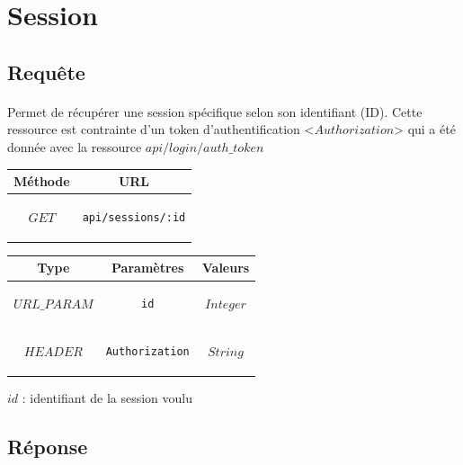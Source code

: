 \documentclass[titlepage, 12pt]{report}
\begin{document}
%
%

\section{Session}

\subsection{Requête}

\paragraph{} Permet de récupérer une session spécifique selon son identifiant (ID). Cette ressource est contrainte d'un token d'authentification <$Authorization$> qui a été donnée avec la ressource $api/login/auth\_token$

\begin{center}
	\begin{tabular}{|c|c|}
	\hline
	Méthode & URL \\
	\hline
	$ GET $ 
	&
	\begin{lstlisting}
api/sessions/:id
	\end{lstlisting} 
	\\ \hline
	\end{tabular}
\end{center}


\begin{center}
	\begin{tabular}{|c|c|c|}
	\hline
	Type & Paramètres & Valeurs \\ \hline
	$ URL\_PARAM $ & 
	\begin{lstlisting}
id
	\end{lstlisting} &
	$ Integer $ \\ \hline
	$ HEADER $ & 
	\begin{lstlisting}
Authorization
	\end{lstlisting} &
	$ String $ \\ \hline
	
	\end{tabular}
\end{center}

\par $ id $ : identifiant de la session voulu
\subsection{Réponse}
\end{document}
